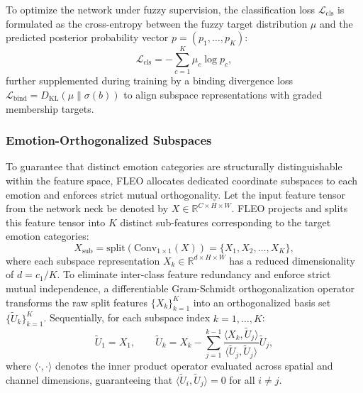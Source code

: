 \documentclass[algorithms,article,submit,moreauthors]{Definitions/mdpi}
\begin{document}
To optimize the network under fuzzy supervision, the classification loss $\mathcal{L}_{\text{cls}}$ is formulated as the cross-entropy between the fuzzy target distribution $\mu$ and the predicted posterior probability vector $p = (p_1, \dots, p_K)$:
\begin{equation}
\mathcal{L}_{\text{cls}} = -\sum_{c=1}^{K} \mu_c \log p_c,
\label{eq:fuzzy_loss}
\end{equation}
further supplemented during training by a binding divergence loss $\mathcal{L}_{\text{bind}} = D_{\text{KL}}(\mu \parallel \sigma(b))$ to align subspace representations with graded membership targets.

\subsubsection{Emotion-Orthogonalized Subspaces}

To guarantee that distinct emotion categories are structurally distinguishable within the feature space, FLEO allocates dedicated coordinate subspaces to each emotion and enforces strict mutual orthogonality. Let the input feature tensor from the network neck be denoted by $X \in \mathbb{R}^{C \times H \times W}$. FLEO projects and splits this feature tensor into $K$ distinct sub-features corresponding to the target emotion categories:
\begin{equation}
X_{\text{sub}} = \text{split}\left(\text{Conv}_{1\times1}(X)\right) = \{X_1, X_2, \dots, X_K\},
\label{eq:subspace_split}
\end{equation}
where each subspace representation $X_k \in \mathbb{R}^{d \times H \times W}$ has a reduced dimensionality of $d = c_1/K$. To eliminate inter-class feature redundancy and enforce strict mutual independence, a differentiable Gram-Schmidt orthogonalization operator transforms the raw split features $\{X_k\}_{k=1}^{K}$ into an orthogonalized basis set $\{\tilde{U}_k\}_{k=1}^{K}$. Sequentially, for each subspace index $k = 1, \dots, K$:
\begin{equation}
\tilde{U}_1 = X_1, \qquad \tilde{U}_k = X_k - \sum_{j=1}^{k-1} \frac{\langle X_k, \tilde{U}_j \rangle}{\langle \tilde{U}_j, \tilde{U}_j \rangle} \tilde{U}_j,
\label{eq:gram_schmidt}
\end{equation}
where $\langle \cdot, \cdot \rangle$ denotes the inner product operator evaluated across spatial and channel dimensions, guaranteeing that $\langle \tilde{U}_i, \tilde{U}_j \rangle = 0$ for all $i \neq j$. 
\end{document}
